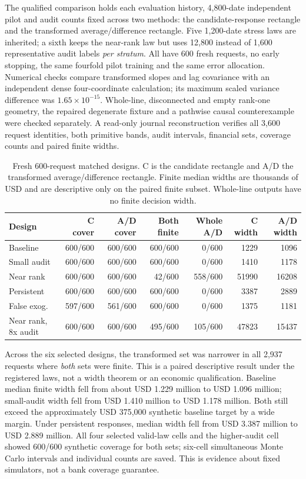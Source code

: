 The qualified comparison holds each evaluation history, 4,800-date independent
pilot and audit counts fixed across two methods: the candidate-response
rectangle and the transformed average/difference rectangle. Five 1,200-date
stress laws are inherited; a sixth keeps the near-rank law but uses 12,800
instead of 1,600 representative audit labels \emph{per stratum}. All have
600 fresh requests, no early stopping, the same fourfold pilot training and
the same error allocation. Numerical checks compare transformed slopes and
lag covariance with an independent dense four-coordinate calculation; its
maximum scaled variance difference was $1.65\times10^{-15}$. Whole-line,
disconnected and empty rank-one geometry, the repaired degenerate fixture and
a pathwise causal counterexample were checked separately. A read-only journal
reconstruction verifies all 3,600 request identities, both primitive bands,
audit intervals, financial sets, coverage counts and paired finite widths.

\begin{table}[htbp]
\centering\small
\caption{Fresh 600-request matched designs. C is the candidate rectangle and A/D the transformed average/difference rectangle. Finite median widths are thousands of USD and are descriptive only on the paired finite subset. Whole-line outputs have no finite decision width.}
\label{integrated:weak_audit_sharpening:tab:sharpening}
\begin{tabular}{lrrrrrr}
\toprule
Design & C cover & A/D cover & Both finite & Whole A/D & C width & A/D width \\
\midrule
Baseline & 600/600 & 600/600 & 600/600 & 0/600 & 1229 & 1096 \\
Small audit & 600/600 & 600/600 & 600/600 & 0/600 & 1410 & 1178 \\
Near rank & 600/600 & 600/600 & 42/600 & 558/600 & 51990 & 16208 \\
Persistent & 600/600 & 600/600 & 600/600 & 0/600 & 3387 & 2889 \\
False exog. & 597/600 & 561/600 & 600/600 & 0/600 & 1375 & 1181 \\
Near rank, 8x audit & 600/600 & 600/600 & 495/600 & 105/600 & 47823 & 15437 \\
\bottomrule
\end{tabular}
\end{table}


Across the six selected designs, the transformed set was narrower in all
2,937 requests where \emph{both} sets were finite. This is a paired descriptive
result under the registered laws, not a width theorem or an economic
qualification. Baseline median finite width fell from about USD 1.229 million
to USD 1.096 million; small-audit width fell from USD 1.410 million to
USD 1.178 million. Both still exceed the approximately USD 375,000 synthetic
baseline target by a wide margin. Under persistent responses, median width
fell from USD 3.387 million to USD 2.889 million. All four selected valid-law
cells and the higher-audit cell showed 600/600 synthetic coverage for both
sets; six-cell simultaneous Monte Carlo intervals and individual counts are
saved. This is evidence about fixed simulators, not a bank coverage guarantee.

